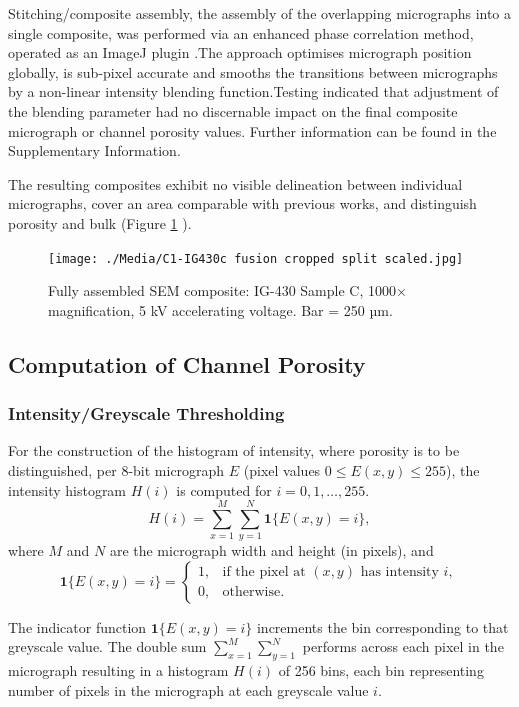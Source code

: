 \documentclass[review]{elsarticle}
\begin{document}
Stitching/composite assembly, the assembly of the overlapping micrographs into a
single composite, was performed via an enhanced phase correlation method,
operated as an ImageJ plugin \citep{ Preibisch2009}.The approach optimises
micrograph position globally, is sub-pixel accurate and smooths the transitions
between micrographs by a non-linear intensity blending function.Testing
indicated that adjustment of the blending parameter had no discernable impact on
the final composite micrograph or channel porosity values. Further information
can be found in the Supplementary Information.

The resulting composites exhibit no visible delineation between individual
micrographs, cover an area comparable with previous works, and distinguish
porosity and bulk (Figure \ref{fig:IG430C split scaled}
\citep{Huang2019,Kane2011a,huang2021statistical}). 

	\begin{figure}
		\centering
		\texttt{[image: ./Media/C1-IG430c fusion cropped split scaled.jpg]}
		\caption{Fully assembled SEM composite: IG-430 Sample C, 1000×  magnification,
     5 kV accelerating voltage. Bar = 250 µm.}
		\label{fig:IG430C split scaled}
	\end{figure} 

\subsection{Computation of Channel Porosity}
\subsubsection{Intensity/Greyscale Thresholding}

For the construction of the histogram of intensity, where porosity is to be
distinguished, per 8-bit micrograph \(E\) (pixel values \(0 \le E(x,y) \le 255\)),
the intensity histogram \(H(i)\) is computed for \(i=0,1,\dots,255\).
\[
H(i) = \sum_{x=1}^{M}\sum_{y=1}^{N} \mathbf{1}\{E(x,y)=i\},
\]
where \(M\) and \(N\) are the micrograph width and height (in pixels), and
\[
\mathbf{1}\{E(x,y)=i\} =
\begin{cases}
1, & \text{if the pixel at }(x,y)\text{ has intensity }i,\\
0, & \text{otherwise.}
\end{cases}
\]

The indicator function \(\mathbf{1}\{E(x,y)=i\}\) increments the bin
corresponding to that greyscale value. The double sum
\(\sum_{x=1}^M\sum_{y=1}^N\) performs  across each pixel in the micrograph
resulting in a histogram \(H(i)\) of 256 bins, each bin representing number of
pixels in the micrograph at each greyscale value \(i\). 
\end{document}
